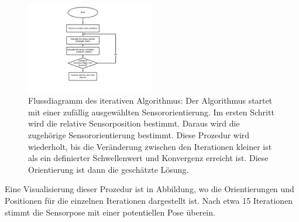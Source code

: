 \begin{figure}[h]
    \centering
    \includegraphics[width=0.5\textwidth,trim = 0 0 0 0]{04_lokalisierung/images/Flussdiagramm.pdf} 
    \caption{Flussdiagramm des iterativen Algorithmus: Der Algorithmus startet mit einer zufällig ausgewählten Sensororientierung. Im ersten Schritt wird die relative Sensorposition bestimmt. Daraus wird die zugehörige Sensororientierung bestimmt. Diese Prozedur wird wiederholt, bis die Veränderung zwischen den Iterationen kleiner ist als ein definierter Schwellenwert und Konvergenz erreicht ist. Diese Orientierung ist dann die geschätzte Lösung.}
    \label{fig:Flussdiagramm}
\end{figure}

	Eine Visualisierung dieser Prozedur ist in Abbildung, wo die Orientierungen und Positionen für die einzelnen Iterationen dargestellt ist. Nach etwa 15 Iterationen stimmt die Sensorpose mit einer potentiellen Pose überein.

